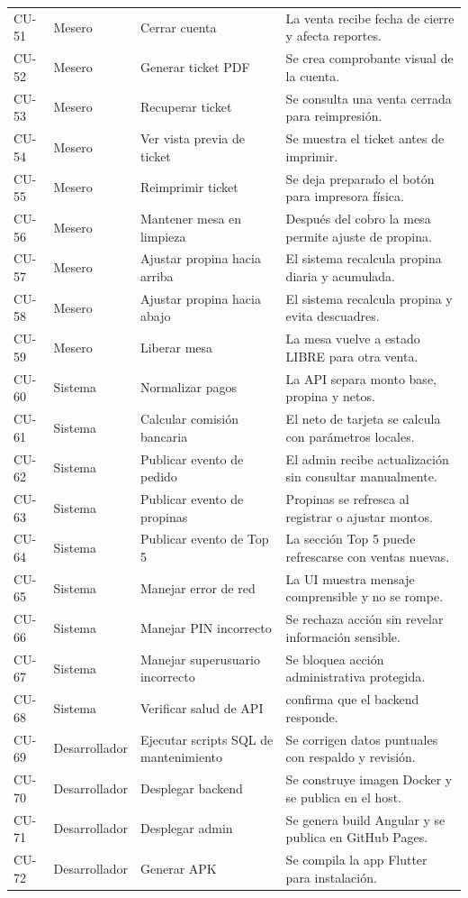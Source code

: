 \documentclass[11pt,letterpaper,openany]{report}
\newcommand{\code}[1]{\texttt{\detokenize{#1}}}
\begin{document}
{\begin{longtable}{p{}p{}p{}p{}}
CU-51 & Mesero & Cerrar cuenta & La venta recibe fecha de cierre y afecta reportes.\\
CU-52 & Mesero & Generar ticket PDF & Se crea comprobante visual de la cuenta.\\
CU-53 & Mesero & Recuperar ticket & Se consulta una venta cerrada para reimpresión.\\
CU-54 & Mesero & Ver vista previa de ticket & Se muestra el ticket antes de imprimir.\\
CU-55 & Mesero & Reimprimir ticket & Se deja preparado el botón para impresora física.\\
CU-56 & Mesero & Mantener mesa en limpieza & Después del cobro la mesa permite ajuste de propina.\\
CU-57 & Mesero & Ajustar propina hacia arriba & El sistema recalcula propina diaria y acumulada.\\
CU-58 & Mesero & Ajustar propina hacia abajo & El sistema recalcula propina y evita descuadres.\\
CU-59 & Mesero & Liberar mesa & La mesa vuelve a estado LIBRE para otra venta.\\
CU-60 & Sistema & Normalizar pagos & La API separa monto base, propina y netos.\\
CU-61 & Sistema & Calcular comisión bancaria & El neto de tarjeta se calcula con parámetros locales.\\
CU-62 & Sistema & Publicar evento de pedido & El admin recibe actualización sin consultar manualmente.\\
CU-63 & Sistema & Publicar evento de propinas & Propinas se refresca al registrar o ajustar montos.\\
CU-64 & Sistema & Publicar evento de Top 5 & La sección Top 5 puede refrescarse con ventas nuevas.\\
CU-65 & Sistema & Manejar error de red & La UI muestra mensaje comprensible y no se rompe.\\
CU-66 & Sistema & Manejar PIN incorrecto & Se rechaza acción sin revelar información sensible.\\
CU-67 & Sistema & Manejar superusuario incorrecto & Se bloquea acción administrativa protegida.\\
CU-68 & Sistema & Verificar salud de API & \code{/api/health} confirma que el backend responde.\\
CU-69 & Desarrollador & Ejecutar scripts SQL de mantenimiento & Se corrigen datos puntuales con respaldo y revisión.\\
CU-70 & Desarrollador & Desplegar backend & Se construye imagen Docker y se publica en el host.\\
CU-71 & Desarrollador & Desplegar admin & Se genera build Angular y se publica en GitHub Pages.\\
CU-72 & Desarrollador & Generar APK & Se compila la app Flutter para instalación.\\
\bottomrule
\end{longtable}
}
\end{document}
